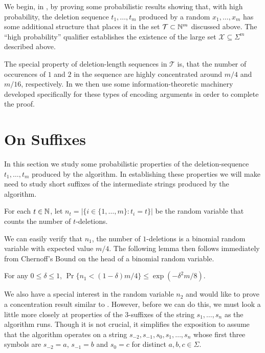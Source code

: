 \documentclass{patmorin}
\begin{document}
We begin, in , by proving some probabilistic results showing that, with high probability, the deletion sequence $t_1,\ldots,t_m$ produced by a random $x_1,\ldots,x_m$ has some additional structure that places it in the set $\mathcal{T}\subset\mathbb{N}^m$ discussed above.  The ``high probability'' qualifier establishes the existence of the large set $\mathcal{X}\subseteq \Sigma^m$ described above.  

The special property of deletion-length sequences in $\mathcal{T}$ is, that the number of occurences of $1$ and $2$ in the sequence are highly concentrated around $m/4$ and $m/16$, respectively. In  we then use some information-theoretic machinery developed specifically for these types of encoding arguments in order to complete the proof.  

\section{On Suffixes}

In this section we study some probabilistic properties of the deletion-sequence $t_1,\ldots,t_m$ produced by the algorithm.  In establishing these properties we will make need to study short suffixes of the intermediate strings produced by the algorithm.  

For each $t\in\mathbb{N}$, let $n_t=|\{i\in\{1,\ldots,m\}: t_i=t\}|$ be the random variable that counts the number of $t$-deletions.

We can easily verify that $n_1$, the number of $1$-deletions is a binomial random variable with expected value $m/4$.  The following lemma then follows immediately from Chernoff's Bound on the head of a binomial random variable.

\begin{lem}
  For any $0\le\delta\le 1$, $\Pr\{n_1 < (1-\delta)m/4\} \le \exp(-\delta^2 m/8)$.
\end{lem}

We also have a special interest in the random variable $n_2$ and would like to prove a concentration result similar to .  However, before we can do this, we must look a little more closely at properties of the 3-suffixes of the string $s_1,\ldots,s_n$ as the algorithm runs.  Though it is not crucial, it simplifies the exposition to assume that the algorithm operates on a string $s_{-2},s_{-1},s_{0},s_1,\ldots,s_n$ whose first three symbols are $s_{-2}=a$, $s_{-1}=b$ and $s_{0}=c$ for distinct $a,b,c\in\Sigma$.  
\end{document}
